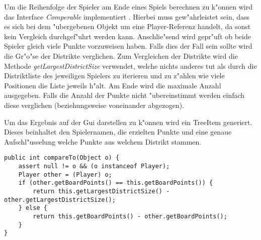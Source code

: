 Um die Reihenfolge der Spieler am Ende eines Spiels berechnen zu k"onnen wird das Interface \emph{Comperable} implementiert . Hierbei muss gew"ahrleistet sein, dass es sich bei dem "ubergebenen Objekt um eine Player-Referenz handelt, da sonst kein Vergleich durchgef"uhrt werden kann. Anschlie"send wird gepr"uft ob beide Spieler gleich viele Punkte vorzuweisen haben. Falls dies der Fall sein sollte wird die Gr"o"se der Distrikte verglichen. Zum Vergleichen der Distrikte wird die Methode \emph{getLargestDistrictSize} verwendet, welche nichts anderes tut als durch die Distriktliste des jeweiligen Spielers zu iterieren und zu z"ahlen wie viele Positionen die Liste jeweils h"alt. Am Ende wird die maximale Anzahl ausgegeben. 
Falls die Anzahl der Punkte nicht "ubereinstimmt werden einfach diese verglichen (beziehungsweise voneinander abgezogen).

Um das Ergebnis auf der Gui darstellen zu k"onnen wird ein TreeItem generiert. Dieses beinhaltet den Spielernamen, die erzielten Punkte und eine genaue Aufschl"usselung welche Punkte aus welchem Distrikt stammen. 
\begin{lstlisting}[style=CodeHighlighting,float,caption=Player - compareTo,label=lst:player_compareTo]
public int compareTo(Object o) {
    assert null != o && (o instanceof Player);
    Player other = (Player) o;
    if (other.getBoardPoints() == this.getBoardPoints()) {
        return this.getLargestDistrictSize() - other.getLargestDistrictSize();
    } else {
        return this.getBoardPoints() - other.getBoardPoints();
    }
}
\end{lstlisting}
 
